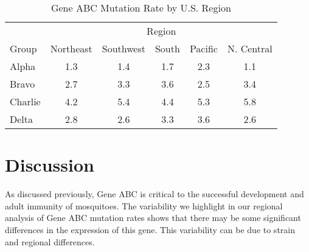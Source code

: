 \begin{table}[h!]
\centering
\begin{tabular}{lccccc}
\toprule
& \multicolumn{5}{c}{Region}\\
\cmidrule(l){2-6}
Group & Northeast & Southwest & South & Pacific & N. Central\\
\midrule
Alpha & 1.3 & 1.4 & 1.7 & 2.3 & 1.1 \\
Bravo & 2.7 & 3.3 & 3.6 & 2.5 & 3.4 \\
Charlie & 4.2 & 5.4 & 4.4 & 5.3 & 5.8 \\
Delta & 2.8 & 2.6 & 3.3 & 3.6 & 2.6 \\
\bottomrule
\end{tabular}
\caption{Gene ABC Mutation Rate by U.S. Region}
\label{mutation}
\end{table}


\section{Discussion}
As discussed previously, Gene ABC is critical to the successful development and adult immunity of mosquitoes. The variability we highlight in our regional analysis of Gene ABC mutation rates shows that there may be some significant differences in the expression of this gene. This variability can be due to strain and regional differences.

